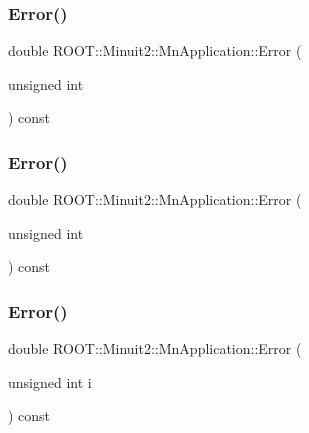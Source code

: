 \subsubsection{\texorpdfstring{Error()}{Error()}\hspace{0.1cm}{\footnotesize\ttfamily [1/6]}}
{\footnotesize\ttfamily double R\+O\+O\+T\+::\+Minuit2\+::\+Mn\+Application\+::\+Error (\begin{DoxyParamCaption}\item[{unsigned int}]{ }\end{DoxyParamCaption}) const}

\mbox{\label{classROOT_1_1Minuit2_1_1MnApplication_aedc3775627672ba2038e8a26d6df13f1}} 
\subsubsection{\texorpdfstring{Error()}{Error()}\hspace{0.1cm}{\footnotesize\ttfamily [2/6]}}
{\footnotesize\ttfamily double R\+O\+O\+T\+::\+Minuit2\+::\+Mn\+Application\+::\+Error (\begin{DoxyParamCaption}\item[{unsigned int}]{ }\end{DoxyParamCaption}) const}

\mbox{\label{classROOT_1_1Minuit2_1_1MnApplication_aedc3775627672ba2038e8a26d6df13f1}} 
\subsubsection{\texorpdfstring{Error()}{Error()}\hspace{0.1cm}{\footnotesize\ttfamily [3/6]}}
{\footnotesize\ttfamily double R\+O\+O\+T\+::\+Minuit2\+::\+Mn\+Application\+::\+Error (\begin{DoxyParamCaption}\item[{unsigned int}]{i }\end{DoxyParamCaption}) const}

